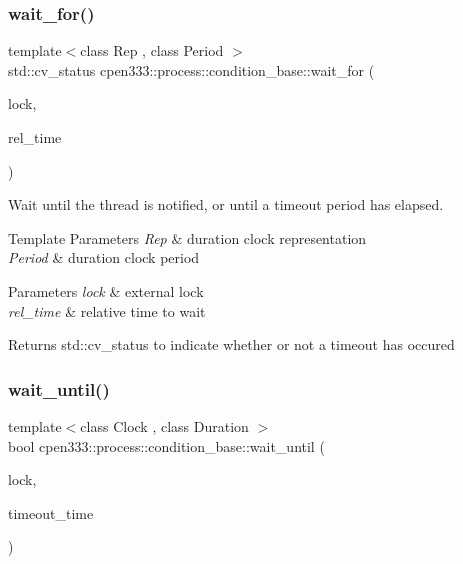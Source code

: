 \subsubsection{\texorpdfstring{wait\+\_\+for()}{wait\_for()}}
{\footnotesize\ttfamily template$<$class Rep , class Period $>$ \\
std\+::cv\+\_\+status cpen333\+::process\+::condition\+\_\+base\+::wait\+\_\+for (\begin{DoxyParamCaption}\item[{std\+::unique\+\_\+lock$<$ \hyperlink{classcpen333_1_1process_1_1mutex}{cpen333\+::process\+::mutex} $>$ \&}]{lock,  }\item[{const std\+::chrono\+::duration$<$ Rep, Period $>$ \&}]{rel\+\_\+time }\end{DoxyParamCaption})\hspace{0.3cm}{\ttfamily [inline]}}



Wait until the thread is notified, or until a timeout period has elapsed. 


\begin{DoxyTemplParams}{Template Parameters}
{\em Rep} & duration clock representation \\
\hline
{\em Period} & duration clock period \\
\hline
\end{DoxyTemplParams}

\begin{DoxyParams}{Parameters}
{\em lock} & external lock \\
\hline
{\em rel\+\_\+time} & relative time to wait \\
\hline
\end{DoxyParams}
\begin{DoxyReturn}{Returns}
std\+::cv\+\_\+status to indicate whether or not a timeout has occured 
\end{DoxyReturn}
\mbox{\label{classcpen333_1_1process_1_1condition__base_a6af33a75565bf4177cb6616a08acaac0}} 
\subsubsection{\texorpdfstring{wait\+\_\+until()}{wait\_until()}}
{\footnotesize\ttfamily template$<$class Clock , class Duration $>$ \\
bool cpen333\+::process\+::condition\+\_\+base\+::wait\+\_\+until (\begin{DoxyParamCaption}\item[{std\+::unique\+\_\+lock$<$ \hyperlink{classcpen333_1_1process_1_1mutex}{cpen333\+::process\+::mutex} $>$ \&}]{lock,  }\item[{const std\+::chrono\+::time\+\_\+point$<$ Clock, Duration $>$ \&}]{timeout\+\_\+time }\end{DoxyParamCaption})\hspace{0.3cm}{\ttfamily [inline]}}



